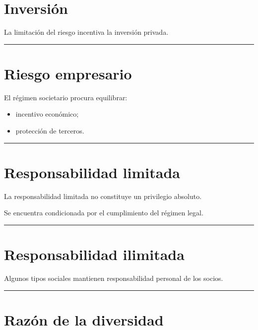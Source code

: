 \documentclass[
  spanish,
  letterpaper,
  DIV=11,
  numbers=noendperiod]{scrartcl}
\providecommand{\tightlist}{%
  \setlength{\itemsep}{0pt}\setlength{\parskip}{0pt}}
\begin{document}
\section{Inversión}\label{inversiuxf3n}

La limitación del riesgo incentiva la inversión privada.

\begin{center}\rule{0.5\linewidth}{0.5pt}\end{center}

\section{Riesgo empresario}\label{riesgo-empresario}

El régimen societario procura equilibrar:

\begin{itemize}
\tightlist
\item
  incentivo económico;
\item
  protección de terceros.
\end{itemize}

\begin{center}\rule{0.5\linewidth}{0.5pt}\end{center}

\section{Responsabilidad limitada}\label{responsabilidad-limitada}

La responsabilidad limitada no constituye un privilegio absoluto.

Se encuentra condicionada por el cumplimiento del régimen legal.

\begin{center}\rule{0.5\linewidth}{0.5pt}\end{center}

\section{Responsabilidad ilimitada}\label{responsabilidad-ilimitada}

Algunos tipos sociales mantienen responsabilidad personal de los socios.

\begin{center}\rule{0.5\linewidth}{0.5pt}\end{center}

\section{Razón de la diversidad}\label{razuxf3n-de-la-diversidad}
\end{document}
